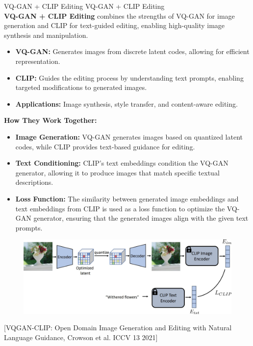 \begin{frame}[allowframebreaks]{VQ-GAN + CLIP Editing}
    \large VQ-GAN + CLIP Editing \\[1em]
    \textbf{VQ-GAN + CLIP Editing} combines the strengths of VQ-GAN for image generation and CLIP for text-guided editing, enabling high-quality image synthesis and manipulation.

    \begin{itemize}
        \item \textbf{VQ-GAN:} Generates images from discrete latent codes, allowing for efficient representation.
        \item \textbf{CLIP:} Guides the editing process by understanding text prompts, enabling targeted modifications to generated images.
        \item \textbf{Applications:} Image synthesis, style transfer, and content-aware editing.
    \end{itemize}
\framebreak
    \textbf{How They Work Together:}
    \begin{itemize}
        \item \textbf{Image Generation:} VQ-GAN generates images based on quantized latent codes, while CLIP provides text-based guidance for editing.
        \item \textbf{Text Conditioning:} CLIP's text embeddings condition the VQ-GAN generator, allowing it to produce images that match specific textual descriptions.
        \item \textbf{Loss Function:} The similarity between generated image embeddings and text embeddings from CLIP is used as a loss function to optimize the VQ-GAN generator, ensuring that the generated images align with the given text prompts.
    \end{itemize}
\framebreak
    \begin{figure}
        \centering
        \includegraphics[width=1\textwidth,height=0.8\textheight,keepaspectratio]{images/video/slide_63_1_img.jpg}
    \end{figure}
    {\footnotesize{[VQGAN-CLIP: Open Domain Image Generation and Editing with Natural Language Guidance, Crowson et al. ICCV 13 2021]}}

\end{frame}
